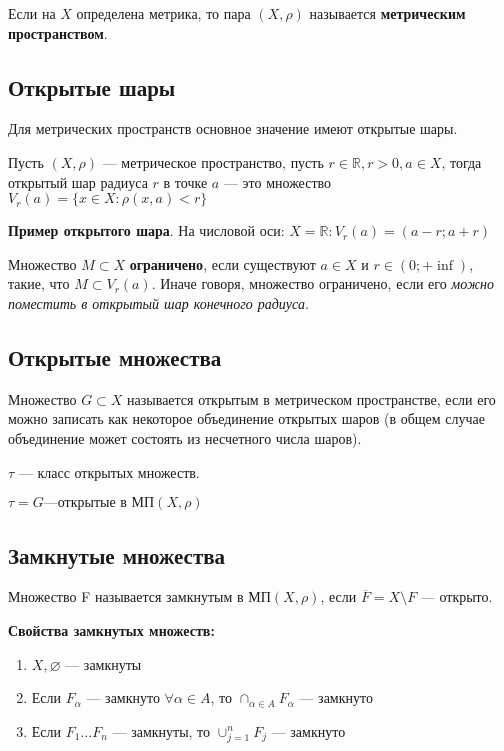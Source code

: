 Если на $X$ определена метрика, то пара $(X, \rho)$ называется \textbf{метрическим пространством}.

\subsection{Открытые шары}

Для метрических пространств основное значение имеют открытые шары.

Пусть $(X,\rho)$ — метрическое пространство, пусть $r \in \mathbb{R}, r > 0, a \in X$, тогда открытый шар радиуса $r$ в точке $a$ — это множество $V_r(a)=\{x \in X : \rho(x,a) < r\}$

\textbf{Пример открытого шара}. На числовой оси: $X = \mathbb{R} : V_r(a)=(a−r; a+r)$

Множество $M \subset X$ \textbf{ограничено}, если существуют $a \in X$ и $r \in (0; +\inf)$, такие, что $M \subset V_r(a)$. Иначе говоря, множество ограничено, если его \textit{можно поместить в открытый шар конечного радиуса}.

\subsection{Открытые множества}

Множество $G \subset X$ называется открытым в метрическом пространстве, если его можно записать как некоторое объединение открытых шаров (в общем случае объединение может состоять из несчетного числа шаров).

    $\tau$ — класс открытых множеств.
    
    $\tau ={G — \text{открытые в МП} (X,\rho)}$

\subsection{Замкнутые множества}

Множество F называется замкнутым в МП$(X,\rho)$, если $\overline{F} = X \setminus F$ — открыто.

\textbf{Свойства замкнутых множеств:}
\begin{enumerate}
    \setlength\itemsep{-0.2em}
    \item $X, \varnothing$ — замкнуты
    \item Если $F_{\alpha}$ — замкнуто $\forall \alpha \in A$, то $\cap_{\alpha \in A}F_{\alpha}$ — замкнуто
    \item Если $F_1…F_n$ — замкнуты, то $\cup_{j=1}^{n}F_j$ — замкнуто
\end{enumerate}

